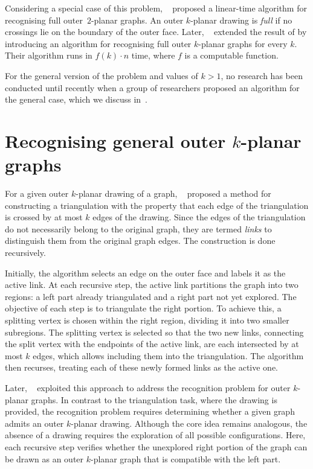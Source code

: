 Considering a special case of this problem, \citeauthor{linear-full-o2p}~\cite{linear-full-o2p} proposed a linear-time algorithm for recognising full outer~\(2\)-planar graphs. An outer \(k\)-planar drawing is \emph{full} if no crossings lie on the boundary of the outer face. Later, \citeauthor{linear-full-okp}~\cite{linear-full-okp} extended the result of \citeauthor{linear-full-o2p} by introducing an algorithm for recognising full outer \(k\)-planar graphs for every \(k\). Their algorithm runs in \(f(k) \cdot n\) time, where \(f\) is a computable function.

For the general version of the problem and values of \(k > 1\), no research has been conducted until recently when a group of researchers proposed an algorithm for the general case, which we discuss in~.


\section{Recognising general outer \texorpdfstring{\(k\)}{k}-planar graphs}\label{sec:recognising-general-outer-(k)-planar-graphs}

For a given outer \(k\)-planar drawing of a graph, \citeauthor{triangulations}~\cite{triangulations} proposed a method for constructing a triangulation with the property that each edge of the triangulation is crossed by at most \(k\) edges of the drawing. Since the edges of the triangulation do not necessarily belong to the original graph, they are termed \emph{links} to distinguish them from the original graph edges. The construction is done recursively.

Initially, the algorithm selects an edge on the outer face and labels it as the active link. At each recursive step, the active link partitions the graph into two regions: a left part already triangulated and a right part not yet explored. The objective of each step is to triangulate the right portion. To achieve this, a splitting vertex is chosen within the right region, dividing it into two smaller subregions. The splitting vertex is selected so that the two new links, connecting the split vertex with the endpoints of the active link, are each intersected by at most \(k\) edges, which allows including them into the triangulation. The algorithm then recurses, treating each of these newly formed links as the active one.

Later, \citeauthor{okp}~\cite{okp} exploited this approach to address the recognition problem for outer \(k\)-planar graphs. In contrast to the triangulation task, where the drawing is provided, the recognition problem requires determining whether a given graph admits an outer \(k\)-planar drawing. Although the core idea remains analogous, the absence of a drawing requires the exploration of all possible configurations. Here, each recursive step verifies whether the unexplored right portion of the graph can be drawn as an outer \(k\)-planar graph that is compatible with the left part.

